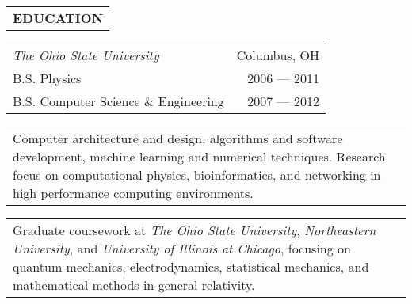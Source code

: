 \begin{tabularx}{\textwidth}{L}
    \textbf{EDUCATION}
\end{tabularx}

\begin{small}

\begin{tabularx}{\textwidth}{L R}
    \normalsize\textit{The Ohio State University} & Columbus, OH \\
    \hspace{10pt}B.S. Physics & 2006 --- 2011 \\
    \hspace{10pt}B.S. Computer Science \& Engineering & 2007 --- 2012 \\
\end{tabularx}
\begin{tabularx}{\textwidth}{X}
    \vspace{1pt}
    Computer architecture and design, algorithms and software development, machine learning and numerical techniques.
    Research focus on computational physics, bioinformatics, and networking in high performance computing environments.
\end{tabularx}
\begin{tabularx}{\textwidth}{X}
    \vspace{1pt}
    Graduate coursework at \textit{The Ohio State University}, \textit{Northeastern University}, and \textit{University of Illinois at Chicago},
    focusing on quantum mechanics, electrodynamics, statistical mechanics, and mathematical methods in general relativity.
\end{tabularx}

\end{small}
